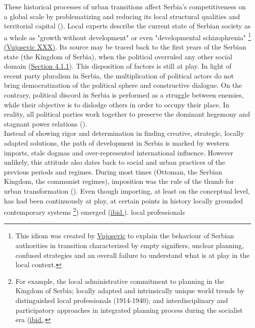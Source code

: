 \documentclass[11pt]{report}
\begin{document}
These historical processes of urban transitions affect Serbia’s competitiveness on a global scale by problematizing and reducing its local structural qualities and territorial capital (\href{Vujosevic}{\citealt{vujosevic_conundrum_2012}}). Local experts describe the current state of Serbian society as a whole as "growth without development" or even "developmental schizophrenia"
\footnote{This idiom was created by \href{ref}{Vujosevic} to explain the behaviour of Serbian authorities in transition characterized by empty signifiers, unclear planning, confused strategies and an overall failure to understand what is at play in the local context.} \href{ref}{(Vujosevic XXX)}.
Its source may be traced back to the first years of the Serbian state (the Kingdom of Serbia), when the political overruled any other social domain (\href{Section 4.1.1}{Section 4.1.1}). This disposition of factors is still at play. In light of recent party pluralism in Serbia, the multiplication of political actors do not bring democratization of the political sphere and constructive dialogue.   On the contrary, political discord in Serbia is performed as a struggle between enemies, while their objective is to dislodge others in order to occupy their place. In reality, all political parties work together to preserve the dominant hegemony and stagnant power relations (\href{Mouffe}{\citealt{mouffe_which_2002}}).
\\

Instead of showing rigor and determination in finding creative, strategic, locally adapted solutions, the path of development in Serbia is marked by western imports, stale dogmas and over-represented international influence. However unlikely, this attitude also dates back to social and urban practices of the previous periods and regimes. During most times (Ottoman, the Serbian Kingdom, the communist regimes), imposition was the rule of the thumb for urban transformation (\href{Nedovic}{\citealt{nedovicbudic_waves_2006}}). Even though importing, at least on the conceptual level, has had been continuously at play, at certain points in history locally grounded contemporary systems
\footnote{For example, the local administrative commitment to planning in the Kingdom of Serbia; locally adapted and intrinsically unique world trends by distinguished local professionals (1914-1940); and interdisciplinary and participatory approaches in integrated planning process during the socialist era (\href{Nedovic}{ibid.}.})
emerged (\href{Nedovic}{ibid.}).
local professionals  
\\
\end{document}
